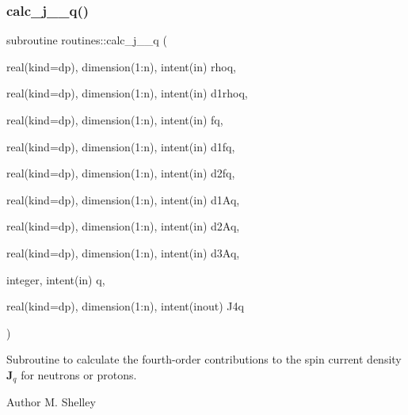 \subsubsection{\texorpdfstring{calc\+\_\+j\+\_\+\_\+q()}{calc\_j\_4\_q()}}
{\footnotesize\ttfamily subroutine routines\+::calc\+\_\+j\+\_\+\_\+q (\begin{DoxyParamCaption}\item[{real(kind=dp), dimension(1\+:n), intent(in)}]{rhoq,  }\item[{real(kind=dp), dimension(1\+:n), intent(in)}]{d1rhoq,  }\item[{real(kind=dp), dimension(1\+:n), intent(in)}]{fq,  }\item[{real(kind=dp), dimension(1\+:n), intent(in)}]{d1fq,  }\item[{real(kind=dp), dimension(1\+:n), intent(in)}]{d2fq,  }\item[{real(kind=dp), dimension(1\+:n), intent(in)}]{d1\+Aq,  }\item[{real(kind=dp), dimension(1\+:n), intent(in)}]{d2\+Aq,  }\item[{real(kind=dp), dimension(1\+:n), intent(in)}]{d3\+Aq,  }\item[{integer, intent(in)}]{q,  }\item[{real(kind=dp), dimension(1\+:n), intent(inout)}]{J4q }\end{DoxyParamCaption})}



Subroutine to calculate the fourth-\/order contributions to the spin current density $\textbf{J}_q$ for neutrons or protons. 

\begin{DoxyAuthor}{Author}
M. Shelley 
\end{DoxyAuthor}


